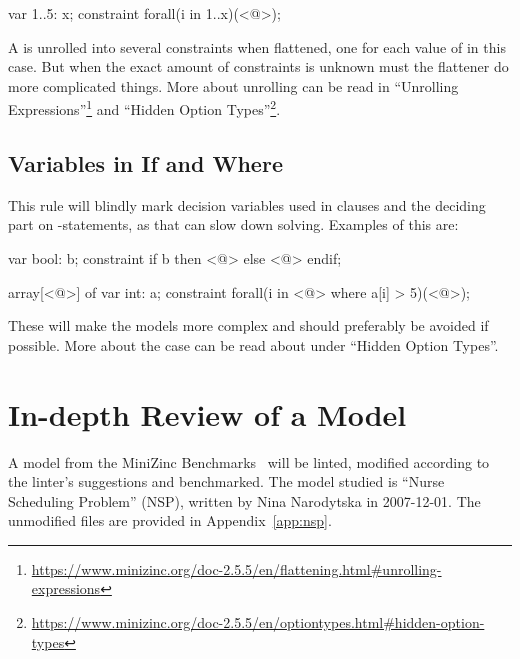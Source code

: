 \documentclass[a4paper,12pt]{article}
\begin{document}
\begin{mznnobreak}
var 1..5: x;
constraint forall(i in 1..x)(<@\dots@>);
\end{mznnobreak}

A  is unrolled into several constraints when flattened, one for each
value of  in this case. But when the exact amount of constraints is unknown must the
flattener do more complicated things. More about unrolling can be read in ``Unrolling
Expressions''\footnote{\url{https://www.minizinc.org/doc-2.5.5/en/flattening.html\#unrolling-expressions}}
and ``Hidden Option Types''\footnote{\url{https://www.minizinc.org/doc-2.5.5/en/optiontypes.html\#hidden-option-types}}.

\subsection{Variables in If and Where}\label{sec:rule:varif}
This rule will blindly mark decision variables used in  clauses and the deciding
part on -statements, as that can slow down solving. Examples of this are:

\begin{mznnobreak}
var bool: b;
constraint if b then <@\dots@> else <@\dots@> endif;
\end{mznnobreak}
\begin{mznnobreak}
array[<@\dots@>] of var int: a;
constraint forall(i in <@\dots@> where a[i] > 5)(<@\dots@>);
\end{mznnobreak}

These will make the models more complex and should preferably be avoided if possible.
More about the  case can be read about under ``Hidden Option
Types''.%

\section{In-depth Review of a Model}\label{sec:nsp}
A model from the MiniZinc Benchmarks~\cite{mznbench} will be linted, modified according to
the linter's suggestions and benchmarked. The model studied is ``Nurse Scheduling
Problem'' (NSP), written by Nina Narodytska in 2007-12-01.
The unmodified files are provided in Appendix~\ref{app:nsp}.
\end{document}
